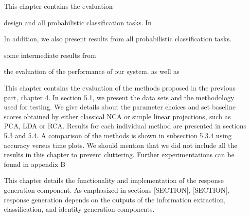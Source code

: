 This chapter contains the evaluation 



design and all probabilistic classification tasks. In 

In addition, we also present results from all probabilistic classification tasks.

some intermediate results from 

the evaluation of the performance of our system, as well as 


This chapter contains the evaluation of the methods proposed in the previous
part, chapter 4. In section 5.1, we present the data sets and the methodology
used for testing. We give details about the parameter choices and set baseline
scores obtained by either classical NCA or simple linear projections, such as PCA,
LDA or RCA. Results for each individual method are presented in sections 5.3
and 5.4. A comparison of the methods is shown in subsection 5.3.4 using accuracy
versus time plots.
We should mention that we did not include all the results in this chapter to
prevent cluttering. Further experimentations can be found in appendix B

This chapter details the functionality and implementation of the response generation component. As emphasized in sections [SECTION], [SECTION], response generation depends on the outputs of the information extraction, classification, and identity generation components. 

